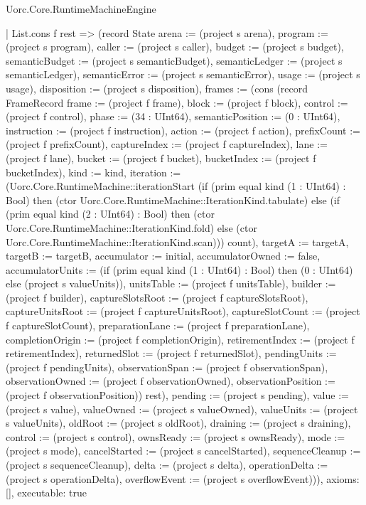 \begin{lexlean}{Uorc.Core.RuntimeMachineEngine}
\begin{semanticmodule}
{    | List.cons f rest => (record State {arena := (project s arena), program := (project s program), caller := (project s caller), budget := (project s budget), semanticBudget := (project s semanticBudget), semanticLedger := (project s semanticLedger), semanticError := (project s semanticError), usage := (project s usage), disposition := (project s disposition), frames := (cons (record FrameRecord {frame := (project f frame), block := (project f block), control := (project f control), phase := (34 : UInt64), semanticPosition := (0 : UInt64), instruction := (project f instruction), action := (project f action), prefixCount := (project f prefixCount), captureIndex := (project f captureIndex), lane := (project f lane), bucket := (project f bucket), bucketIndex := (project f bucketIndex), kind := kind, iteration := (Uorc.Core.RuntimeMachine::iterationStart (if (prim equal kind (1 : UInt64) : Bool) then (ctor Uorc.Core.RuntimeMachine::IterationKind.tabulate) else (if (prim equal kind (2 : UInt64) : Bool) then (ctor Uorc.Core.RuntimeMachine::IterationKind.fold) else (ctor Uorc.Core.RuntimeMachine::IterationKind.scan))) count), targetA := targetA, targetB := targetB, accumulator := initial, accumulatorOwned := false, accumulatorUnits := (if (prim equal kind (1 : UInt64) : Bool) then (0 : UInt64) else (project s valueUnits)), unitsTable := (project f unitsTable), builder := (project f builder), captureSlotsRoot := (project f captureSlotsRoot), captureUnitsRoot := (project f captureUnitsRoot), captureSlotCount := (project f captureSlotCount), preparationLane := (project f preparationLane), completionOrigin := (project f completionOrigin), retirementIndex := (project f retirementIndex), returnedSlot := (project f returnedSlot), pendingUnits := (project f pendingUnits), observationSpan := (project f observationSpan), observationOwned := (project f observationOwned), observationPosition := (project f observationPosition)}) rest), pending := (project s pending), value := (project s value), valueOwned := (project s valueOwned), valueUnits := (project s valueUnits), oldRoot := (project s oldRoot), draining := (project s draining), control := (project s control), ownsReady := (project s ownsReady), mode := (project s mode), cancelStarted := (project s cancelStarted), sequenceCleanup := (project s sequenceCleanup), delta := (project s delta), operationDelta := (project s operationDelta), overflowEvent := (project s overflowEvent)})),
  axioms: [],
  executable: true
}


\end{semanticmodule}
\end{lexlean}

